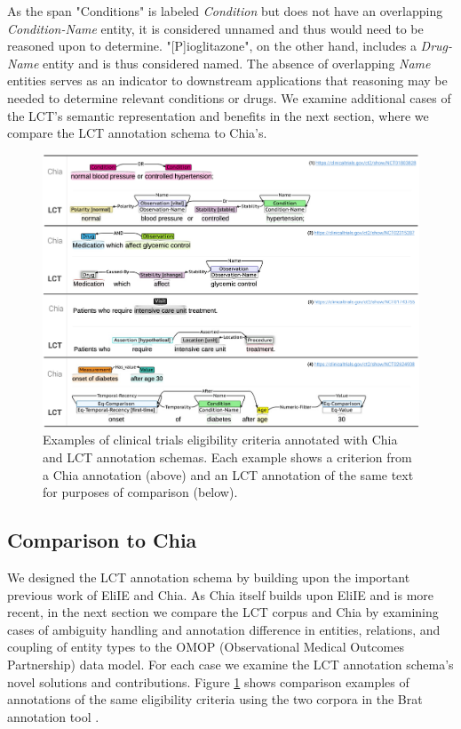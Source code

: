 \documentclass[fleqn,10pt]{wlscirep}
\begin{document}
\noindent As the span "Conditions" is labeled \textit{Condition} but does not have an overlapping \textit{Condition-Name} entity, it is considered unnamed and thus would need to be reasoned upon to determine. "[P]ioglitazone", on the other hand, includes a \textit{Drug-Name} entity and is thus considered named. The absence of overlapping \textit{Name} entities serves as an indicator to downstream applications that reasoning may be needed to determine relevant conditions or drugs. We examine additional cases of the LCT's semantic representation and benefits in the next section, where we compare the LCT annotation schema to Chia's.

\begin{figure}[ht!]
  \includegraphics[scale=0.56]{chia_vs_lct.pdf}  
    \caption{Examples of clinical trials eligibility criteria annotated with Chia and LCT annotation schemas. Each example shows a criterion from a Chia annotation (above) and an LCT annotation of the same text for purposes of comparison (below).}
    \label{fig_chia_vs_lct}
\end{figure}

\subsection*{Comparison to Chia}
We designed the LCT annotation schema by building upon the important previous work of EliIE and Chia. As Chia itself builds upon EliIE and is more recent, in the next section we compare the LCT corpus and Chia by examining cases of ambiguity handling and annotation difference in entities, relations, and coupling of entity types to the OMOP \cite{hripcsak2015observational} (Observational Medical Outcomes Partnership) data model. For each case we examine the LCT annotation schema's novel solutions and contributions. Figure \ref{fig_chia_vs_lct} shows comparison examples of annotations of the same eligibility criteria using the two corpora in the Brat annotation tool \cite{stenetorp2012brat}.
\end{document}
